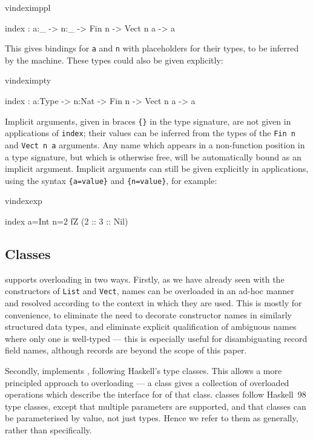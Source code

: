 \begin{SaveVerbatim}{vindeximppl}

index : {a:_} -> {n:_} -> Fin n -> Vect n a -> a

\end{SaveVerbatim}

\noindent
This gives bindings for \texttt{a} and \texttt{n} with placeholders for
their types, to be inferred by the machine. These types could also be given explicitly:

\begin{SaveVerbatim}{vindeximpty}

index : {a:Type} -> {n:Nat} -> Fin n -> Vect n a -> a

\end{SaveVerbatim}

\noindent
Implicit arguments, given in braces \texttt{\{\}} in the type signature, are
not given in applications of \texttt{index}; their values can be inferred from
the types of the \texttt{Fin n} and \texttt{Vect n a} arguments. Any name which
appears in a non-function position in a type signature, but which is otherwise
free, will be automatically bound as an implicit argument.  Implicit arguments
can still be given explicitly in applications, using the syntax
\texttt{\{a=value\}} and \texttt{\{n=value\}}, for example:

\begin{SaveVerbatim}{vindexexp}

index {a=Int} {n=2} fZ (2 :: 3 :: Nil)

\end{SaveVerbatim}

\subsection{Classes}

\Idris{} supports overloading in two ways. Firstly, as we have already seen
with the constructors of \texttt{List} and \texttt{Vect}, names can be
overloaded in an ad-hoc manner and resolved according to the context in which
they are used. This is mostly for convenience, to eliminate the need to
decorate constructor names in similarly structured data types, and eliminate
explicit qualification of ambiguous names where only one is well-typed --- this
is especially useful for disambiguating record field names, although records
are beyond the scope of this paper.

Secondly, \Idris{} implements , following Haskell's type
classes.  This allows a more principled approach to overloading --- a class
gives a collection of overloaded operations which describe the interface for
 of that class. \Idris{} classes follow Haskell~98 type
classes, except that multiple parameters are supported, and that classes can be
parameterised by  value, not just types.
Hence we refer to
them as  generally, rather than 
specifically.

